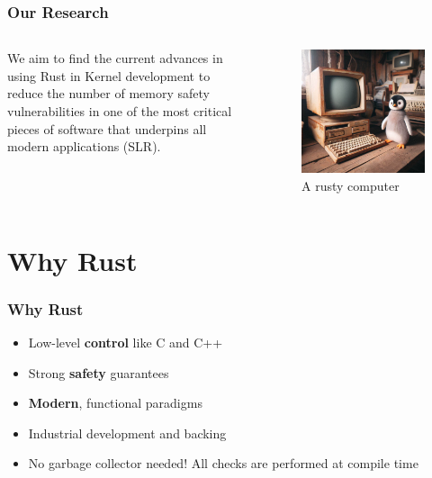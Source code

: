 \documentclass{beamer}
\begin{document}
\begin{frame}
  \frametitle{Our Research}
  \begin{columns}
    \begin{column}{0.5\textwidth}
      We aim to find the current advances in using Rust in Kernel development to reduce the number of
      memory safety vulnerabilities in one of the most critical pieces of software that underpins all
      modern applications (SLR).
    \end{column}
    \begin{column}{0.5\textwidth}
      \begin{figure}
        \caption{A rusty computer\footnotemark[1]}
        \includegraphics[width=.8\textwidth]{images/rusty.jpeg}\footnotemark[1]
      \end{figure}
    \end{column}
  \end{columns}
  \href{https://github.com/shanep/esem-2024/blob/master/proofs/esem24-50.pdf}{}
\end{frame}

\section{Why Rust}
\begin{frame}
  \frametitle{Why Rust}
  \begin{itemize}
  \item<1-> Low-level \textbf{control} like C and C++
  \item<2-> Strong \textbf{safety} guarantees
  \item<3-> \textbf{Modern}, functional paradigms
  \item<4-> Industrial development and backing
  \item<5-> No garbage collector needed! All checks are performed at compile time
  \end{itemize}
\end{frame}
\end{document}
